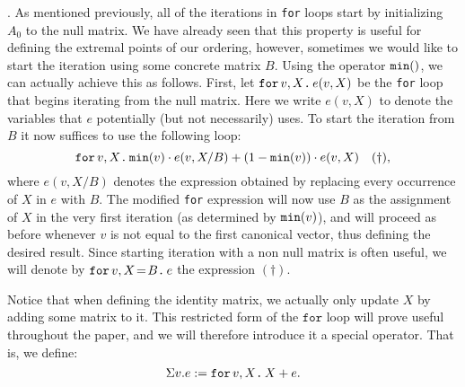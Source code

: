 .  As mentioned previously, all of the iterations in \texttt{for} loops start by initializing $A_0$ to the null matrix. We have already seen that this property is useful for defining the extremal points of our ordering, however, sometimes we would like to start the iteration using some concrete matrix $B$. Using the operator $\mmin$, we can actually achieve this as follows. First, let $\ffor{v}{X}{e(v,X)}$ be the \texttt{for} loop that begins iterating from the null matrix. Here we write $e(v,X)$ to denote the variables that $e$ potentially (but not necessarily) uses. To start the iteration from $B$ it now suffices to use the following loop:
$$\ffor{v}{X}{\mmin{v}\cdot e(v,X/B) + (1-\mmin{v})\cdot e(v,X)} \quad (\dag),$$
where $e(v,X/B)$ denotes the expression obtained by replacing every occurrence of $X$ in $e$ with $B$. The modified \texttt{for} expression will now use $B$ as the assignment of $X$ in the very first iteration (as determined by $\mmin{v}$), and will proceed as before whenever $v$ is not equal to the first canonical vector, thus defining the desired result. Since starting iteration with a non null matrix is often useful, we will denote  by $\initf{B}{v}{X}{e}$ the expression $(\dag)$.

\medskip

 Notice that when defining the identity matrix, we actually only update $X$ by adding some matrix to it. This restricted form of the $\texttt{for}$ loop will prove useful throughout the paper, and we will therefore introduce it a special operator. That is, we define:
$$\Sigma v. e := \ffor{v}{X}{X + e}.$$

